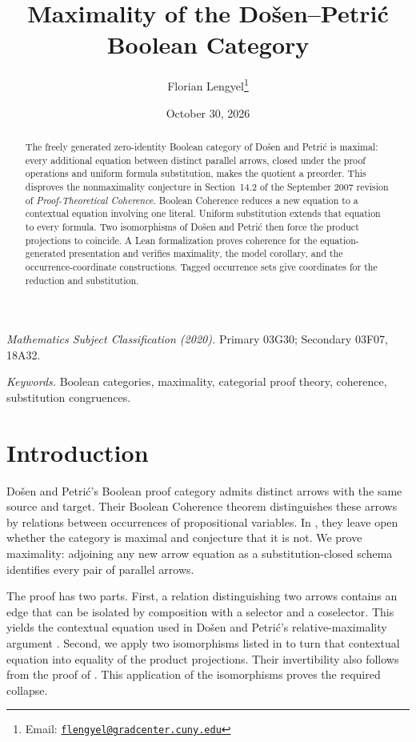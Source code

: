 \documentclass[11pt]{article}
\title{Maximality of the Do\v{s}en--Petri\'c Boolean Category}
\author{Florian Lengyel\thanks{Email: \href{mailto:flengyel@gradcenter.cuny.edu}{\texttt{flengyel@gradcenter.cuny.edu}}}}
\date{October 30, 2026}
\begin{document}
\maketitle

\begin{abstract}
The freely generated zero-identity Boolean category of Do\v{s}en and
Petri\'c is maximal: every additional equation between distinct parallel
arrows, closed under the proof operations and uniform formula
substitution, makes the quotient a preorder. This disproves the
nonmaximality conjecture in Section~14.2 of the September 2007 revision
of \emph{Proof-Theoretical Coherence}. Boolean Coherence reduces a new
equation to a contextual equation involving one literal. Uniform
substitution extends that equation to every formula. Two
isomorphisms of Do\v{s}en and Petri\'c then force the product projections
to coincide. A Lean formalization proves coherence for the equation-generated
presentation and verifies maximality, the model corollary, and the
occurrence-coordinate constructions. Tagged occurrence
sets give coordinates for the reduction and substitution.
\end{abstract}

\medskip
\noindent\textit{Mathematics Subject Classification (2020).}
Primary 03G30; Secondary 03F07, 18A32.

\smallskip
\noindent\textit{Keywords.} Boolean categories, maximality, categorial proof theory,
coherence, substitution congruences.

\section{Introduction}

Do\v{s}en and Petri\'c's Boolean proof category admits distinct arrows
with the same source and target. Their Boolean Coherence theorem
distinguishes these arrows by relations between occurrences of
propositional variables. In \cite[\S14.2, p.~322]{DP}, they leave open
whether the category is maximal and conjecture that it is not. We prove
maximality: adjoining any new arrow equation as a substitution-closed
schema identifies every pair of parallel arrows.

The proof has two parts. First, a relation distinguishing two arrows
contains an edge that can be isolated by composition with a selector
and a coselector. This yields the contextual equation used in
Do\v{s}en and Petri\'c's relative-maximality argument
\cite[\S9.7, pp.~215--216]{DP}. Second, we apply two isomorphisms listed in
\cite[\S12.5, p.~294]{DP} to turn that contextual equation into equality
of the product projections. Their invertibility also follows from the
proof of \cite[Lemma~7]{DPIsomorphic}. This application of the
isomorphisms proves the required collapse.
\end{document}
